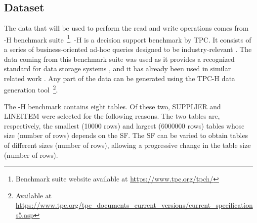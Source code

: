 \subsection{Dataset}
\label{subsec:dataset}

The data that will be used to perform the read and write operations comes from -H benchmark suite~\footnote{Benchmark suite website available at \url{https://www.tpc.org/tpch/}}. -H is a decision support benchmark by \gls{TPC}. It consists of a series of business-oriented ad-hoc queries designed to be industry-relevant \cite{transactionprocessingperformancecounciltpcTPCH_v301pdf1993}. The data coming from this benchmark suite was used as
it provides a recognized standard for data storage systems \cite{TPC_benchmarks_2000}, and it has already been used in similar related work \cite{raasveldtDuckDBEmbeddableAnalytical2019, behmPhotonFastQuery2022}. Any part of the data can be generated using the TPC-H data generation tool~\footnote{Available at \url{https://www.tpc.org/tpc_documents_current_versions/current_specifications5.asp}}.

The -H benchmark contains eight tables. Of these two, SUPPLIER and LINEITEM were selected for the following reasons. The two tables are, respectively, the smallest (10000 rows) and largest (6000000 rows) tables whose size (number of rows) depends on the \gls{SF}. The \gls{SF} can be varied to obtain tables of different sizes (number of rows), allowing a progressive change in the table size (number of rows). 

